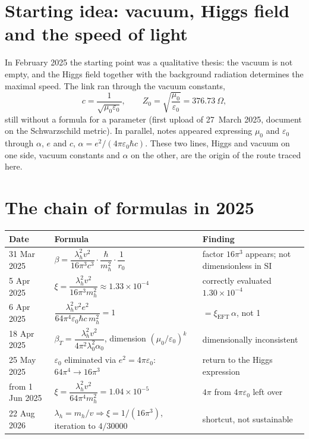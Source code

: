 \section{Starting idea: vacuum, Higgs field and the speed of light}

In February 2025 the starting point was a qualitative thesis: the vacuum is not empty, and the
Higgs field together with the background radiation determines the maximal speed. The link ran
through the vacuum constants,
\begin{equation}
  c=\frac{1}{\sqrt{\mu_0\varepsilon_0}},\qquad Z_0=\sqrt{\frac{\mu_0}{\varepsilon_0}}=376.73\ \Omega ,
\end{equation}
still without a formula for a parameter (first upload of 27~March 2025, document on the
Schwarzschild metric). In parallel, notes appeared expressing $\mu_0$ and $\varepsilon_0$ through
$\alpha$, $e$ and $c$, $\alpha=e^2/(4\pi\varepsilon_0\hbar c)$. These two lines, Higgs and vacuum
on one side, vacuum constants and $\alpha$ on the other, are the origin of the route traced here.

\section{The chain of formulas in 2025}

\begin{center}
\small
\begin{tabular}{@{}p{2.2cm}p{6.4cm}p{5.4cm}@{}}
\toprule
\textbf{Date} & \textbf{Formula} & \textbf{Finding} \\
\midrule
31 Mar 2025 & $\beta=\dfrac{\lambda_h^2v^2}{16\pi^3c^3}\cdot\dfrac{\hbar}{m_h^2}\cdot\dfrac1{r_0}$ & factor $16\pi^3$ appears; not dimensionless in SI \\[8pt]
5 Apr 2025 & $\xi=\dfrac{\lambda_h^2v^2}{16\pi^3m_h^2}\approx1.33\times10^{-4}$ & correctly evaluated $1.30\times10^{-4}$ \\[8pt]
6 Apr 2025 & $\dfrac{\lambda_h^2v^2e^2}{64\pi^4\varepsilon_0\hbar c\,m_h^2}=1$ & $=\xi_{\text{EFT}}\,\alpha$, not 1 \\[8pt]
18 Apr 2025 & $\beta_T=\dfrac{\lambda_h^2v^2}{4\pi^2\lambda_0^2\alpha_0}$, dimension $(\mu_0/\varepsilon_0)^k$ & dimensionally inconsistent \\[8pt]
25 May 2025 & $\varepsilon_0$ eliminated via $e^2=4\pi\varepsilon_0$: $64\pi^4\to16\pi^3$ & return to the Higgs expression \\[8pt]
from 1 Jun 2025 & $\xi=\dfrac{\lambda_h^2v^2}{64\pi^4m_h^2}=1.04\times10^{-5}$ & $4\pi$ from $4\pi\varepsilon_0$ left over \\[8pt]
22 Aug 2026 & $\lambda_h=m_h/v\Rightarrow\xi=1/(16\pi^3)$, iteration to $4/30000$ & shortcut, not sustainable \\
\bottomrule
\end{tabular}
\end{center}

